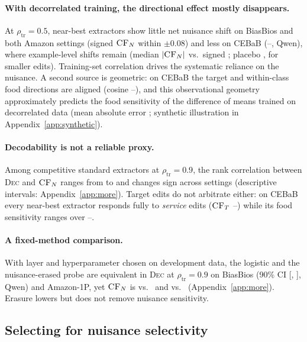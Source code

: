 \documentclass[11pt]{article}
\newcommand{\rhot}{\rho_{\text{tr}}}
\newcommand{\dec}{\textsc{Dec}}
\newcommand{\cfn}{\textsc{CF}_{N}}
\newcommand{\cft}{\textsc{CF}_{T}}
\begin{document}
\paragraph{With decorrelated training, the directional effect mostly disappears.} At $\rhot=0.5$, near-best extractors show little net nuisance shift on BiasBios and both Amazon settings (signed $\cfn$ within $\pm0.08$) and less on CEBaB (\nbCFmincebabQFive--\nbCFmaxcebabQFive, Qwen), where example-level shifts remain (median $|\cfn|$ \absCFcebabQFive{} vs.\ signed \sgnCFcebabQFive; placebo \placebocebabQFive, for smaller edits). Training-set correlation drives the systematic reliance on the nuisance. A second source is geometric: on CEBaB the target and within-class food directions are aligned (cosine \cosMincebab--\cosMaxcebab), and this observational geometry approximately predicts the food sensitivity of the difference of means trained on decorrelated data (mean absolute error \geomMAEcebab; synthetic illustration in Appendix~\ref{app:synthetic}).

\paragraph{Decodability is not a reliable proxy.} Among competitive standard extractors at $\rhot=0.9$, the rank correlation between \dec{} and $\cfn$ ranges from \corrCFmin{} to \corrCFmax{} and changes sign across settings (descriptive intervals: Appendix~\ref{app:more}). Target edits do not arbitrate either: on CEBaB every near-best extractor responds fully to \emph{service} edits ($\cft$ \cfTmin--\cfTmax) while its food sensitivity ranges over \cfNnbMin--\cfNnbMax.

\paragraph{A fixed-method comparison.} With layer and hyperparameter chosen on development data, the logistic and the nuisance-erased probe are equivalent in \dec{} at $\rhot=0.9$ on BiasBios (90\% CI [\fpLobiosQNine, \fpHibiosQNine], Qwen) and Amazon-1P, yet $\cfn$ is \fpCFlrbiosQNine{} vs.\ \fpCFnebiosQNine{} and \fpCFlramzfpQNine{} vs.\ \fpCFneamzfpQNine{} (Appendix~\ref{app:more}). Erasure lowers but does not remove nuisance sensitivity.

\subsection{Selecting for nuisance selectivity}
\label{sec:selection}
\end{document}
